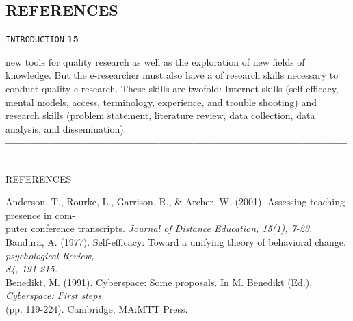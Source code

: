\documentclass[8pt]{beamer}
\begin{document}
\begin{frame}
\section*{REFERENCES}
\begin{flushright}
 \texttt{INTRODUCTION} \hspace*{1cm} \textbf{15}
\end{flushright}

\vspace*{0.5cm}
\small{ new tools for quality research as well as the exploration of new fields of knowledge. But the e-researcher must also have a of research skills necessary to conduct quality e-research. These skills are twofold: Internet skills (self-efficacy, mental models, access, terminology, experience, and trouble shooting) and research skills (problem statement, literature review, data collection, data analysis, and dissemination)}.\\

 \vspace*{0.6cm}
 \textbf{---------------------------------------------------------------------------------------------------------------------}\\
\large{REFERENCES

}

\vspace*{0.1cm}
\small{Anderson, T., Rourke, L., Garrison, R., \& Archer, W. (2001). Assessing teaching presence in com-\\
\hspace*{0.4cm} puter conference transcripts. \emph{Journal of Distance Education, 15(1), 7-23.}\\
Bandura, A. (1977). Self-efficacy: Toward a unifying theory of behavioral change. \emph{psychological Review, \\
\hspace*{0.4cm} 84, 191-215.}\\
Benedikt, M. (1991). Cyberspace: Some proposals. In M. Benedikt (Ed.), \emph{Cyberspace: First steps }\\
\hspace*{0.4cm} (pp. 119-224). Cambridge, MA:MTT Press.\\}
\end{frame}
\end{document}
